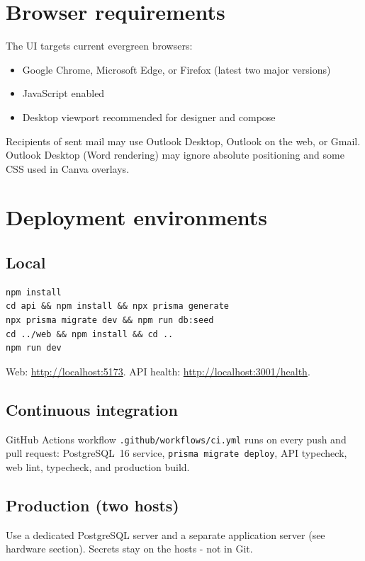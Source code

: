 \documentclass[11pt,a4paper]{article}
\begin{document}
\section{Browser requirements}
\label{sec:browsers}
The UI targets current evergreen browsers:

\begin{itemize}[leftmargin=1.4em]
  \item Google Chrome, Microsoft Edge, or Firefox (latest two major versions)
  \item JavaScript enabled
  \item Desktop viewport recommended for designer and compose
\end{itemize}

Recipients of sent mail may use Outlook Desktop, Outlook on the web, or Gmail. Outlook Desktop (Word rendering) may ignore absolute positioning and some CSS used in Canva overlays.

\section{Deployment environments}

\subsection{Local}
\begin{verbatim}
npm install
cd api && npm install && npx prisma generate
npx prisma migrate dev && npm run db:seed
cd ../web && npm install && cd ..
npm run dev
\end{verbatim}
Web: \url{http://localhost:5173}. API health: \url{http://localhost:3001/health}.

\subsection{Continuous integration}
GitHub Actions workflow \texttt{.github/workflows/ci.yml} runs on every push and pull request: PostgreSQL~16 service, \texttt{prisma migrate deploy}, API typecheck, web lint, typecheck, and production build.

\subsection{Production (two hosts)}
Use a dedicated PostgreSQL server and a separate application server (see hardware section). Secrets stay on the hosts - not in Git.
\end{document}
